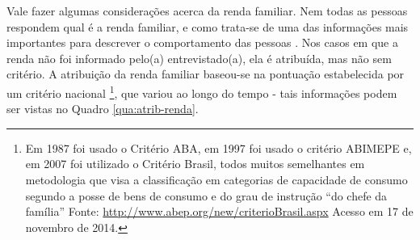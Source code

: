 



Vale fazer algumas considerações acerca da renda familiar. Nem todas as pessoas respondem qual é a renda familiar, e como trata-se de uma das informações mais importantes para descrever o comportamento das pessoas \cite{SHEARMUR2006}. %
Nos casos em que a renda não foi informado pelo(a) entrevistado(a), ela é atribuída, mas não sem critério. A atribuição da renda familiar baseou-se na pontuação estabelecida por um critério nacional%
\footnote{Em 1987 foi usado o Critério ABA, em 1997 foi usado o critério ABIMEPE e, em 2007 foi utilizado o Critério Brasil, todos muitos semelhantes em metodologia que visa a classificação em categorias de capacidade de consumo segundo a posse de bens de consumo e do grau de instrução ``do chefe da família''
Fonte: \url{http://www.abep.org/new/criterioBrasil.aspx} Acesso em 17 de novembro de 2014.},
que variou ao longo do tempo - tais informações podem ser vistas no Quadro \ref{qua:atrib-renda}.


